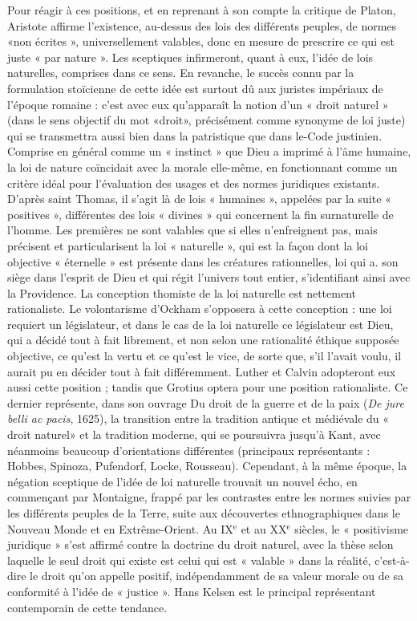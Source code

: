 Pour réagir à ces positions, et en reprenant à son compte la critique de Platon,
Aristote affirme l’existence, au-dessus des
%
lois des différents peuples, de normes
«non écrites », universellement valables,
donc en mesure de prescrire ce qui est
juste « par nature ». Les sceptiques infirmeront, quant à eux, l’idée de lois naturelles, comprises dans ce sens. En
revanche, le succès connu par la formulation stoïcienne de cette idée est surtout
dû aux juristes impériaux de l’époque
romaine : c’est avec eux qu'apparaît la
notion d’un « droit naturel » (dans le sens
objectif du mot «droit», précisément
comme synonyme de loi juste) qui se
transmettra aussi bien dans la patristique
que dans le-Code justinien. Comprise en
général comme un « instinct » que Dieu a
imprimé à l'âme humaine, la loi de nature
coïncidait avec la morale elle-même, en
fonctionnant comme un critère idéal pour
l'évaluation des usages et des normes juridiques existants. D’après saint Thomas, il
s’agit là de lois « humaines », appelées par
la suite « positives », différentes des lois
« divines » qui concernent la fin surnaturelle de l’homme. Les premières ne sont
valables que si elles n’enfreignent pas,
mais précisent et particularisent la loi
« naturelle », qui est la façon dont la loi
objective « éternelle » est présente dans
les créatures rationnelles, loi qui a. son
siège dans l'esprit de Dieu et qui régit
l'univers tout entier, s’identifiant ainsi
avec la Providence. La conception thomiste de la loi naturelle est nettement
rationaliste. Le volontarisme d’Ockham
s’opposera à cette conception : une loi
requiert un législateur, et dans le cas de
la loi naturelle ce législateur est Dieu, qui
a décidé tout à fait librement, et non selon
une rationalité éthique supposée objective, ce qu'est la vertu et ce qu'est le vice,
de sorte que, s’il l’avait voulu, il aurait pu
en décider tout à fait différemment.
Luther et Calvin adopteront eux aussi
cette position ; tandis que Grotius optera
pour une position rationaliste. Ce dernier
représente, dans son ouvrage Du droit de
la guerre et de la paix ({\it De jure belli ac
pacis}, 1625), la transition entre la tradition antique et médiévale du « droit naturel» et la tradition moderne, qui se
poursuivra jusqu’à Kant, avec néanmoins
beaucoup d’orientations différentes (principaux représentants : Hobbes, Spinoza,
Pufendorf, Locke, Rousseau). Cependant,
à la même époque, la négation sceptique
de l’idée de loi naturelle trouvait un nouvel écho, en commençant par Montaigne,
%
frappé par les contrastes entre les normes
suivies par les différents peuples de la
Terre, suite aux découvertes ethnographiques dans le Nouveau Monde et en
Extrême-Orient. Au {\footnotesize IX}$^\text{e}$  et au {\footnotesize XX}$^\text{e}$ siècles, le
« positivisme juridique » s’est affirmé
contre la doctrine du droit naturel, avec
la thèse selon laquelle le seul droit qui
existe est celui qui est « valable » dans la
réalité, c’est-à-dire le droit qu’on appelle
positif, indépendamment de sa valeur
morale ou de sa conformité à l’idée de
« justice ». Hans Kelsen est le principal
représentant contemporain de cette tendance.

